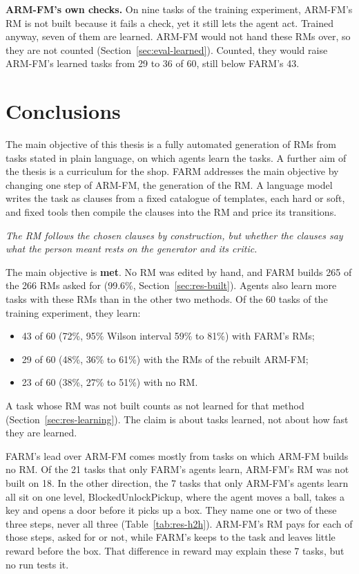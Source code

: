 \documentclass[11pt,english,listoffigures,listoftables]{tfgetsinf}
\newcommand{\keyidea}[1]{\par\smallskip\noindent\hspace*{0.6em}{\color{gray!55}\vrule width 1.5pt}\hspace{8pt}\parbox[t]{\dimexpr\linewidth-0.6em-9.5pt\relax}{\itshape #1}\par\smallskip}  %
\begin{document}
\textbf{ARM-FM's own checks.} On nine tasks of the training experiment, ARM-FM's RM is not built because it fails a check, yet it still lets the agent act. Trained anyway, seven of them are learned. ARM-FM would not hand these RMs over, so they are not counted (Section~\ref{sec:eval-learned}). Counted, they would raise ARM-FM's learned tasks from 29 to 36 of 60, still below FARM's 43.

\chapter{Conclusions}
\label{chap:conclusions}

The main objective of this thesis is a fully automated generation of RMs from tasks stated in plain language, on which agents learn the tasks. A further aim of the thesis is a curriculum for the shop. FARM addresses the main objective by changing one step of ARM-FM, the generation of the RM. A language model writes the task as clauses from a fixed catalogue of templates, each hard or soft, and fixed tools then compile the clauses into the RM and price its transitions.

\keyidea{The RM follows the chosen clauses by construction, but whether the clauses say what the person meant rests on the generator and its critic.}

\noindent The main objective is \textbf{met}. No RM was edited by hand, and FARM builds 265 of the 266 RMs asked for (99.6\%, Section~\ref{sec:res-built}). Agents also learn more tasks with these RMs than in the other two methods. Of the 60 tasks of the training experiment, they learn:
\begin{itemize}
    \item 43 of 60 (72\%, 95\% Wilson interval 59\% to 81\%) with FARM's RMs;
    \item 29 of 60 (48\%, 36\% to 61\%) with the RMs of the rebuilt ARM-FM;
    \item 23 of 60 (38\%, 27\% to 51\%) with no RM.
\end{itemize}
\noindent A task whose RM was not built counts as not learned for that method (Section~\ref{sec:res-learning}). The claim is about tasks learned, not about how fast they are learned.

FARM's lead over ARM-FM comes mostly from tasks on which ARM-FM builds no RM. Of the 21 tasks that only FARM's agents learn, ARM-FM's RM was not built on 18. In the other direction, the 7 tasks that only ARM-FM's agents learn all sit on one level, \mbox{BlockedUnlockPickup}, where the agent moves a ball, takes a key and opens a door before it picks up a box. They name one or two of these three steps, never all three (Table~\ref{tab:res-h2h}). ARM-FM's RM pays for each of those steps, asked for or not, while FARM's keeps to the task and leaves little reward before the box. That difference in reward may explain these 7 tasks, but no run tests it.
\end{document}
